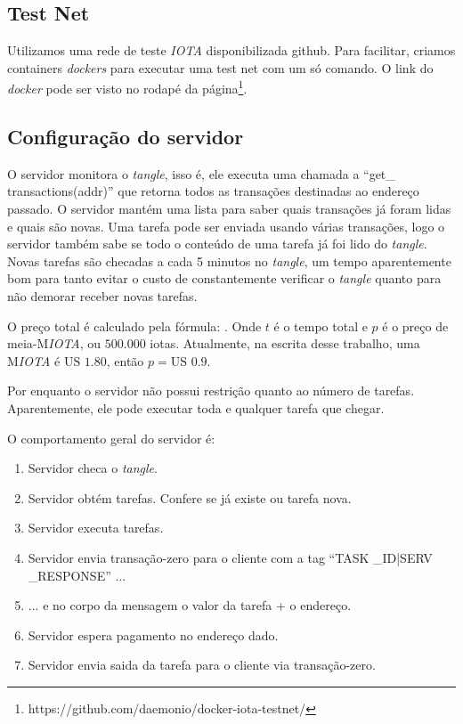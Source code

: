\documentclass[a4paper]{article}
\begin{document}
\subsection{Test Net}

Utilizamos uma rede de teste \textit{IOTA} disponibilizada github. Para facilitar, criamos containers \textit{dockers} para executar uma test
net com um só comando. O link do \textit{docker} pode ser visto no rodapé da página\footnote{https://github.com/daemonio/docker-iota-testnet/}.

\subsection{Configuração do servidor}

O servidor monitora o \textit{tangle}, isso é, ele executa uma chamada a ``get\_ transactions(addr)'' que retorna todos as transações destinadas
ao endereço passado. O servidor mantém uma lista para saber quais transações já foram lidas e quais são novas. Uma tarefa pode ser enviada
usando várias transações, logo o servidor também sabe se todo o conteúdo de uma tarefa já foi lido do \textit{tangle}. Novas tarefas são checadas a cada
5 minutos no \textit{tangle}, um tempo aparentemente bom para tanto evitar o custo de constantemente verificar o \textit{tangle} quanto para não demorar receber novas tarefas.

O preço total é calculado pela fórmula: . Onde $t$ é o tempo total e $p$ é o preço de meia-M\textit{IOTA}, ou $500.000$ iotas.
Atualmente, na escrita desse trabalho, uma M\textit{IOTA} é $\text{US }1.80$, então $p = \text{US }0.9$.

Por enquanto o servidor não possui restrição quanto ao número de tarefas. Aparentemente, ele pode executar toda e qualquer tarefa que chegar.

O comportamento geral do servidor é:

\begin{enumerate}
\item Servidor checa o \textit{tangle}.
\item Servidor obtém tarefas. Confere se já existe ou tarefa nova.
\item Servidor executa tarefas.
\item Servidor envia transação-zero para o cliente com a tag ``TASK \_ID|SERV \_RESPONSE'' ...
\item ... e no corpo da mensagem o valor da tarefa + o endereço.
\item Servidor espera pagamento no endereço dado.
\item Servidor envia saida da tarefa para o cliente via transação-zero.
\end{enumerate}
\end{document}
